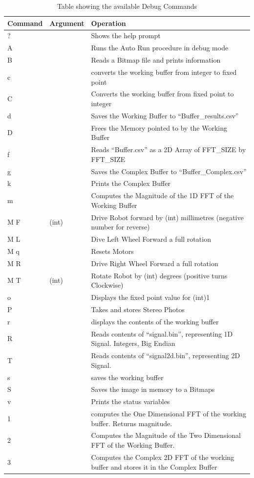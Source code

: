 \begin{table}
\centering
\caption{Table showing the available Debug Commands}
\label{table:Debug}
\begin{tabular}{|l|l|p{10cm}|}\hline
Command & Argument & Operation \\\hline
? && Shows the help prompt\\ 
A && Runs the Auto Run procedure in debug mode\\ 
B && Reads a Bitmap file and prints information \\ 
c && converts the working buffer from integer to fixed point\\
C && Converts the working buffer from fixed point to integer\\
d && Saves the Working Buffer to ``Buffer\_results.csv'' \\ 
D && Frees the Memory pointed to by the Working Buffer \\ 
f && Reads ``Buffer.csv'' as a 2D Array of FFT\_SIZE by FFT\_SIZE\\ 
g && Saves the Complex Buffer to ``Buffer\_Complex.csv'' \\
k && Prints the Complex Buffer \\ 
m && Computes the Magnitude of the 1D FFT of the Working Buffer \\
M F &(int) & Drive Robot forward by (int) millimetres (negative number for reverse)\\
M L && Dive Left Wheel Forward a full rotation \\
M q && Resets Motors \\
M R && Drive Right Wheel Forward a full rotation \\
M T &(int) & Rotate Robot by (int) degrees (positive turns Clockwise)\\
o && Displays the fixed point value for (int)1 \\
P && Takes and stores Stereo Photos \\ 
r && displays the contents of the working buffer\\
R && Reads contents of ``signal.bin'', representing 1D Signal. Integers, Big Endian\\
T && Reads contents of ``signal2d.bin'', representing 2D Signal. \\ 
s && saves the working buffer\\
S && Saves the image in memory to a Bitmaps \\
v && Prints the status variables \\ 
1 && computes the One Dimensional FFT of the working buffer. Returns magnitude.\\
2 && Computes the Magnitude of the Two Dimensional FFT of the Working Buffer. \\ 
3 && Computes the Complex 2D FFT of the working buffer and stores it in the Complex Buffer \\ \hline
\end{tabular}
\end{table}


